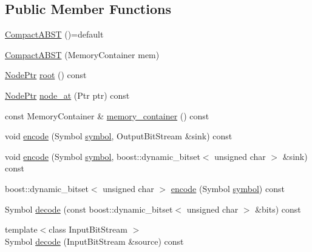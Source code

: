 \subsection*{Public Member Functions}
\begin{DoxyCompactItemize}
\item 
\mbox{\hyperlink{classirk_1_1io_1_1CompactABST_ac974514e8763630b313b9993705aa0ee}{Compact\+A\+B\+ST}} ()=default
\item 
\mbox{\hyperlink{classirk_1_1io_1_1CompactABST_a107f624adb553882f94ef03d7cd087f7}{Compact\+A\+B\+ST}} (Memory\+Container mem)
\item 
\mbox{\hyperlink{structirk_1_1io_1_1CompactABST_1_1NodePtr}{Node\+Ptr}} \mbox{\hyperlink{classirk_1_1io_1_1CompactABST_acb1286c5e308a6835f2dc6d1c953f872}{root}} () const
\item 
\mbox{\hyperlink{structirk_1_1io_1_1CompactABST_1_1NodePtr}{Node\+Ptr}} \mbox{\hyperlink{classirk_1_1io_1_1CompactABST_ae36a68eca86403a1441109c1bbac4321}{node\+\_\+at}} (Ptr ptr) const
\item 
const Memory\+Container \& \mbox{\hyperlink{classirk_1_1io_1_1CompactABST_a2a9213d54020cf0f293a8a8b40fefc95}{memory\+\_\+container}} () const
\item 
void \mbox{\hyperlink{classirk_1_1io_1_1CompactABST_a41ec0899895d07a801088fb7bd12292f}{encode}} (Symbol \mbox{\hyperlink{porter2_8hpp_a04438e24473719aaf288c57833717164}{symbol}}, Output\+Bit\+Stream \&sink) const
\item 
void \mbox{\hyperlink{classirk_1_1io_1_1CompactABST_aaa86fe71000a2446039b03e22ffc282b}{encode}} (Symbol \mbox{\hyperlink{porter2_8hpp_a04438e24473719aaf288c57833717164}{symbol}}, boost\+::dynamic\+\_\+bitset$<$ unsigned char $>$ \&sink) const
\item 
boost\+::dynamic\+\_\+bitset$<$ unsigned char $>$ \mbox{\hyperlink{classirk_1_1io_1_1CompactABST_a38b8b4a08ef2b7513d2dac5cd15c9f31}{encode}} (Symbol \mbox{\hyperlink{porter2_8hpp_a04438e24473719aaf288c57833717164}{symbol}}) const
\item 
Symbol \mbox{\hyperlink{classirk_1_1io_1_1CompactABST_a4ba2b7511695ab2494250280d7166a55}{decode}} (const boost\+::dynamic\+\_\+bitset$<$ unsigned char $>$ \&bits) const
\item 
{\footnotesize template$<$class Input\+Bit\+Stream $>$ }\\Symbol \mbox{\hyperlink{classirk_1_1io_1_1CompactABST_a3d38e31d07dba9f6e90b03c8b5ce4e74}{decode}} (Input\+Bit\+Stream \&source) const
\end{DoxyCompactItemize}
